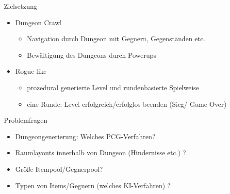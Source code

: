 \begin{frame}{Zielsetzung}
\begin{itemize}
\item Dungeon Crawl
\begin{itemize}
    \item Navigation durch Dungeon mit Gegnern, Gegenständen etc.
    \item Bewältigung des Dungeons durch Powerups
\end{itemize}
\item Rogue-like
\begin{itemize}
    \item prozedural generierte Level und rundenbasierte Spielweise
    \item eine Runde: Level erfolgreich/erfolglos beenden (Sieg/ Game Over)
\end{itemize}
\end{itemize}
\end{frame}

\begin{frame}{Problemfragen}
\begin{itemize}
    \item Dungeongenerierung: Welches PCG-Verfahren?
    \item Raumlayouts innerhalb von Dungeon (Hindernisse etc.) ?
    \item Größe Itempool/Gegnerpool?
    \item Typen von Items/Gegnern (welches KI-Verfahren) ?
\end{itemize}
\end{frame}